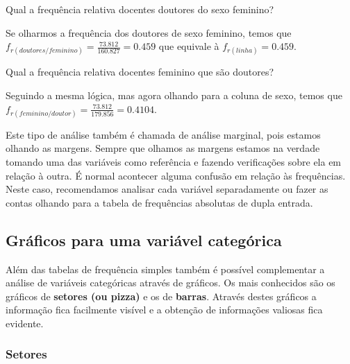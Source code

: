 \documentclass[12pt,]{style/krantz}
\theoremstyle{definition}
\theoremstyle{definition}
\theoremstyle{definition}
\theoremstyle{remark}
\let\BeginKnitrBlock\begin \let\EndKnitrBlock\end
\begin{document}
\BeginKnitrBlock{exercise}
\protect\hypertarget{exr:unnamed-chunk-32}{}{\label{exr:unnamed-chunk-32} }Qual a frequência relativa docentes doutores do sexo feminino?
\EndKnitrBlock{exercise}

\BeginKnitrBlock{solution}
\iffalse{} {Solução. } \fi{}Se olharmos a frequência dos doutores de sexo feminino, temos que \(f_{r(doutores/feminino)} = \frac{73.812}{160.827} = 0.459\) que equivale à \(f_{r(linha)} = 0.459\).
\EndKnitrBlock{solution}

\BeginKnitrBlock{exercise}
\protect\hypertarget{exr:unnamed-chunk-34}{}{\label{exr:unnamed-chunk-34} }Qual a frequência relativa docentes feminino que são doutores?
\EndKnitrBlock{exercise}

\BeginKnitrBlock{solution}
\iffalse{} {Solução. } \fi{}Seguindo a mesma lógica, mas agora olhando para a coluna de sexo, temos que \(f_{r(feminino/doutor)} = \frac{73.812}{179.856} = 0.4104\).
\EndKnitrBlock{solution}

Este tipo de análise também é chamada de análise marginal, pois estamos olhando as margens. Sempre que olhamos as margens estamos na verdade tomando uma das variáveis como referência e fazendo verificações sobre ela em relação à outra.
É normal acontecer alguma confusão em relação às frequências. Neste caso, recomendamos analisar cada variável separadamente ou fazer as contas olhando para a tabela de frequências absolutas de dupla entrada.

\hypertarget{graficos-para-uma-variavel-categorica}{%
\subsection{Gráficos para uma variável categórica}\label{graficos-para-uma-variavel-categorica}}

Além das tabelas de frequência simples também é possível complementar a análise de variáveis categóricas através de gráficos. Os mais conhecidos são os gráficos de \textbf{setores (ou pizza)} e os de \textbf{barras}. Através destes gráficos a informação fica facilmente visível e a obtenção de informações valiosas fica evidente.

\hypertarget{setores}{%
\subsubsection{Setores}\label{setores}}
\end{document}
